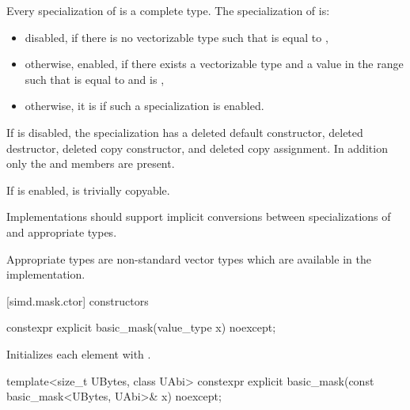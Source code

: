 \pnum
Every specialization of  is a complete type.
The specialization of  is:
\begin{itemize}
 \item
   disabled, if there is no vectorizable type  such that 
   is equal to ,
 \item
   otherwise, enabled, if there exists a vectorizable type  and a
   value  in the range  such that  is equal
   to  and  is ,
 \item
   otherwise, it is  if such a specialization is enabled.
\end{itemize}

If  is disabled, the specialization has a
deleted default constructor, deleted destructor, deleted copy constructor, and
deleted copy assignment.
In addition only the  and  members are
present.

If  is enabled,
 is trivially copyable.

\pnum
\recommended Implementations should support implicit conversions between
specializations of  and appropriate  types.
\begin{note}
Appropriate types are non-standard vector types which are available in the
implementation.
\end{note}

[simd.mask.ctor]{ constructors}

\begin{itemdecl}
constexpr explicit basic_mask(value_type x) noexcept;
\end{itemdecl}

\begin{itemdescr}
\pnum
\effects
Initializes each element with .
\end{itemdescr}

\begin{itemdecl}
template<size_t UBytes, class UAbi>
  constexpr explicit basic_mask(const basic_mask<UBytes, UAbi>& x) noexcept;
\end{itemdecl}

